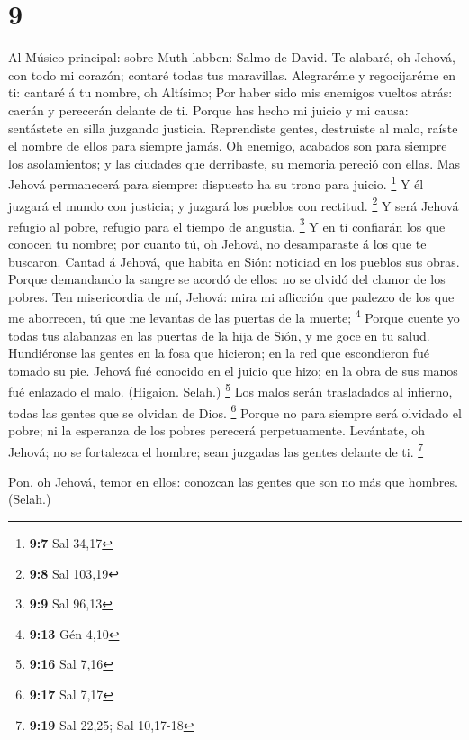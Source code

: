 \hypertarget{section-8}{%
\section{9}\label{section-8}}

 Al Músico principal: sobre Muth-labben: Salmo de David. Te
alabaré, oh Jehová, con todo mi corazón; contaré todas tus maravillas.
 Alegraréme y regocijaréme en ti: cantaré á tu nombre, oh
Altísimo;  Por haber sido mis enemigos vueltos atrás: caerán
y perecerán delante de ti.  Porque has hecho mi juicio y mi
causa: sentástete en silla juzgando justicia.  Reprendiste
gentes, destruiste al malo, raíste el nombre de ellos para siempre
jamás.  Oh enemigo, acabados son para siempre los
asolamientos; y las ciudades que derribaste, su memoria pereció con
ellas.  Mas Jehová permanecerá para siempre: dispuesto ha su
trono para juicio. \footnote{\textbf{9:7} Sal 34,17}  Y él
juzgará el mundo con justicia; y juzgará los pueblos con rectitud.
\footnote{\textbf{9:8} Sal 103,19}  Y será Jehová refugio al
pobre, refugio para el tiempo de angustia. \footnote{\textbf{9:9} Sal
  96,13}  Y en ti confiarán los que conocen tu nombre; por
cuanto tú, oh Jehová, no desamparaste á los que te buscaron.
 Cantad á Jehová, que habita en Sión: noticiad en los
pueblos sus obras.  Porque demandando la sangre se acordó
de ellos: no se olvidó del clamor de los pobres.  Ten
misericordia de mí, Jehová: mira mi aflicción que padezco de los que me
aborrecen, tú que me levantas de las puertas de la muerte; \footnote{\textbf{9:13}
  Gén 4,10}  Porque cuente yo todas tus alabanzas en las
puertas de la hija de Sión, y me goce en tu salud. 
Hundiéronse las gentes en la fosa que hicieron; en la red que
escondieron fué tomado su pie.  Jehová fué conocido en el
juicio que hizo; en la obra de sus manos fué enlazado el malo. (Higaion.
Selah.) \footnote{\textbf{9:16} Sal 7,16}  Los malos serán
trasladados al infierno, todas las gentes que se olvidan de Dios.
\footnote{\textbf{9:17} Sal 7,17}  Porque no para siempre
será olvidado el pobre; ni la esperanza de los pobres perecerá
perpetuamente.  Levántate, oh Jehová; no se fortalezca el
hombre; sean juzgadas las gentes delante de ti. \footnote{\textbf{9:19}
  Sal 22,25; Sal 10,17-18}

 Pon, oh Jehová, temor en ellos: conozcan las gentes que
son no más que hombres. (Selah.)

